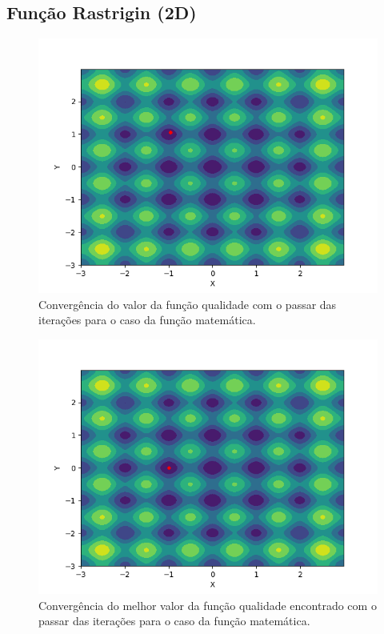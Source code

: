 \documentclass[conference]{IEEEtran}
\begin{document}
\subsection{Função Rastrigin (2D)}

\begin{figure}[htbp]
\centering
\centerline{\includegraphics[scale=0.4]{imagens/rastrigin/ses.png}}
\caption{Convergência do valor da função qualidade com o passar das iterações para o caso da função matemática.}
\label{rastrigin/ses}
\end{figure} 

\begin{figure}[htbp]
\centering
\centerline{\includegraphics[scale=0.4]{imagens/rastrigin/cmaes.png}}
\caption{Convergência do melhor valor da função qualidade encontrado com o passar das iterações para o caso da função matemática.}
\label{rastrigin/cmaes}
\end{figure}
\end{document}
